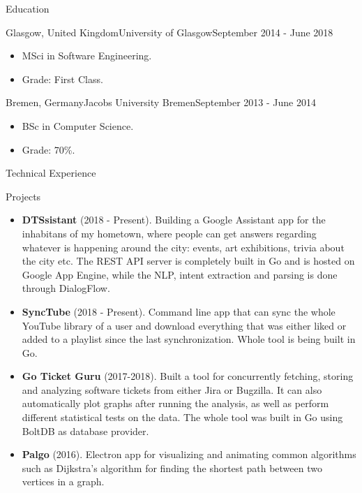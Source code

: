 \documentclass[]{cv}
\begin{document}
	\begin{cvsection}{Education}
		\begin{cvsubsection}{Glasgow, United Kingdom}{University of Glasgow}{September 2014 - June 2018}
			\begin{itemize}
				\item MSci in Software Engineering.
				\item Grade: First Class.
			\end{itemize}
		\end{cvsubsection}
		\begin{cvsubsection}{Bremen, Germany}{Jacobs University Bremen}{September 2013 - June 2014}
			\begin{itemize}
				\item BSc in Computer Science.
				\item Grade: 70\%.
			\end{itemize}
		\end{cvsubsection}

	\end{cvsection}
	
	\begin{cvsection}{Technical Experience}
		\begin{cvsubsection}{Projects}{}{}
			\begin{itemize}
				\item \textbf{DTSsistant} (2018 - Present). Building a Google Assistant app for the inhabitans of my hometown, 
				where people can get answers regarding whatever is happening around the city: 
				events, art exhibitions, trivia about the city etc.
				The REST API server is completely built in Go and is hosted on Google App Engine, while the NLP,
				intent extraction and parsing is done through DialogFlow.
				\item \textbf{SyncTube} (2018 - Present). Command line app that can sync the whole YouTube library of a user and download everything that was 
				either liked or added to a playlist since the last synchronization. Whole tool is being built in Go.
				\item \textbf{Go Ticket Guru} (2017-2018). Built a tool for concurrently fetching, storing and analyzing software tickets from 
				either Jira or Bugzilla. It can also automatically plot graphs after running the analysis, as well as perform different 
				statistical tests on the data. The whole tool was built in Go using BoltDB as database provider.
				\item \textbf{Palgo} (2016).  Electron app for visualizing and animating common algorithms such as Dijkstra’s algorithm for finding the 
				shortest path between two vertices in a graph.
			\end{itemize}
		\end{cvsubsection}
	\end{cvsection}
	
\end{document}

